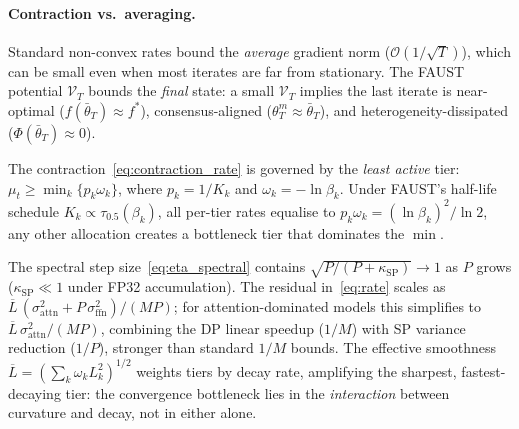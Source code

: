\documentclass{article}
\begin{document}
\paragraph{Contraction vs.\ averaging.}
Standard non-convex rates bound the \emph{average} gradient norm
($\mathcal{O}(1/\sqrt{T})$), which can be small even when most iterates
are far from stationary. The FAUST potential $\mathcal{V}_T$ bounds the
\emph{final} state: a small $\mathcal{V}_T$ implies the last iterate is
near-optimal ($f(\bar\theta_T) \approx f^*$), consensus-aligned
($\theta_T^m \approx \bar\theta_T$), and heterogeneity-dissipated
($\Phi(\bar\theta_T) \approx 0$).

The contraction~\eqref{eq:contraction_rate} is governed by the
\emph{least active} tier: $\mu_t \geq \min_k\{p_k\omega_k\}$, where
$p_k = 1/K_k$ and $\omega_k = -\ln\beta_k$. Under FAUST's half-life
schedule $K_k \propto \tau_{0.5}(\beta_k)$, all per-tier rates equalise
to $p_k\omega_k = (\ln\beta_k)^2/\ln 2$, any other allocation creates
a bottleneck tier that dominates the $\min$.

The spectral step size~\eqref{eq:eta_spectral} contains
$\sqrt{P/(P + \kappa_{\mathrm{SP}})} \to 1$ as $P$ grows
($\kappa_{\mathrm{SP}} \ll 1$ under FP32 accumulation). The residual
in~\eqref{eq:rate} scales as
$\overline{L}\,(\sigma_{\mathrm{attn}}^2 + P\,\sigma_{\mathrm{ffn}}^2)/(MP)$;
for attention-dominated models this simplifies to
$\overline{L}\,\sigma_{\mathrm{attn}}^2/(MP)$, combining the DP linear
speedup ($1/M$) with SP variance reduction ($1/P$), stronger than
standard $1/M$ bounds.
The effective smoothness
$\overline{L} = (\sum_k \omega_k L_k^2)^{1/2}$ weights tiers by decay
rate, amplifying the sharpest, fastest-decaying tier: the convergence
bottleneck lies in the \emph{interaction} between curvature and decay,
not in either alone.
\end{document}
